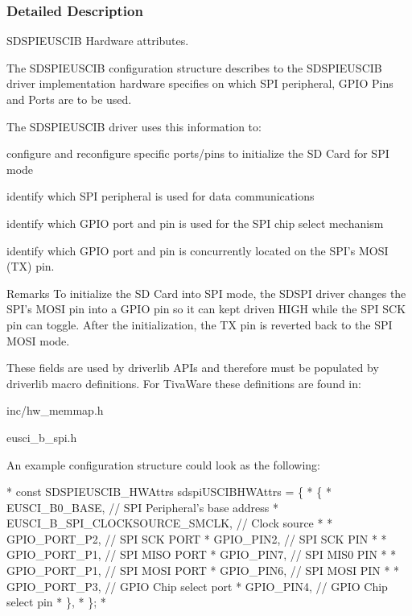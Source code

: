 \subsubsection{Detailed Description}
S\-D\-S\-P\-I\-E\-U\-S\-C\-I\-B Hardware attributes. 

The S\-D\-S\-P\-I\-E\-U\-S\-C\-I\-B configuration structure describes to the S\-D\-S\-P\-I\-E\-U\-S\-C\-I\-B driver implementation hardware specifies on which S\-P\-I peripheral, G\-P\-I\-O Pins and Ports are to be used.

The S\-D\-S\-P\-I\-E\-U\-S\-C\-I\-B driver uses this information to\-:
\begin{DoxyItemize}
\item configure and reconfigure specific ports/pins to initialize the S\-D Card for S\-P\-I mode
\item identify which S\-P\-I peripheral is used for data communications
\item identify which G\-P\-I\-O port and pin is used for the S\-P\-I chip select mechanism
\item identify which G\-P\-I\-O port and pin is concurrently located on the S\-P\-I's M\-O\-S\-I (T\-X) pin.
\end{DoxyItemize}

\begin{DoxyRemark}{Remarks}
To initialize the S\-D Card into S\-P\-I mode, the S\-D\-S\-P\-I driver changes the S\-P\-I's M\-O\-S\-I pin into a G\-P\-I\-O pin so it can kept driven H\-I\-G\-H while the S\-P\-I S\-C\-K pin can toggle. After the initialization, the T\-X pin is reverted back to the S\-P\-I M\-O\-S\-I mode.
\end{DoxyRemark}
These fields are used by driverlib A\-P\-Is and therefore must be populated by driverlib macro definitions. For Tiva\-Ware these definitions are found in\-:
\begin{DoxyItemize}
\item inc/hw\-\_\-memmap.\-h
\item eusci\-\_\-b\-\_\-spi.\-h
\end{DoxyItemize}

An example configuration structure could look as the following\-: 
\begin{DoxyCode}
*  \textcolor{keyword}{const} SDSPIEUSCIB_HWAttrs sdspiUSCIBHWAttrs = \{
*      \{
*           EUSCI\_B0\_BASE, \textcolor{comment}{// SPI Peripheral's base address}
*           EUSCI\_B\_SPI\_CLOCKSOURCE\_SMCLK, \textcolor{comment}{// Clock source}
*
*           GPIO\_PORT\_P2,  \textcolor{comment}{// SPI SCK PORT}
*           GPIO\_PIN2,     \textcolor{comment}{// SPI SCK PIN}
*
*           GPIO\_PORT\_P1,  \textcolor{comment}{// SPI MISO PORT}
*           GPIO\_PIN7,     \textcolor{comment}{// SPI MIS0 PIN}
*
*           GPIO\_PORT\_P1,  \textcolor{comment}{// SPI MOSI PORT}
*           GPIO\_PIN6,     \textcolor{comment}{// SPI MOSI PIN}
*
*           GPIO\_PORT\_P3,  \textcolor{comment}{// GPIO Chip select port}
*           GPIO\_PIN4,     \textcolor{comment}{// GPIO Chip select pin}
*       \},
*  \};
*  
\end{DoxyCode}
 

